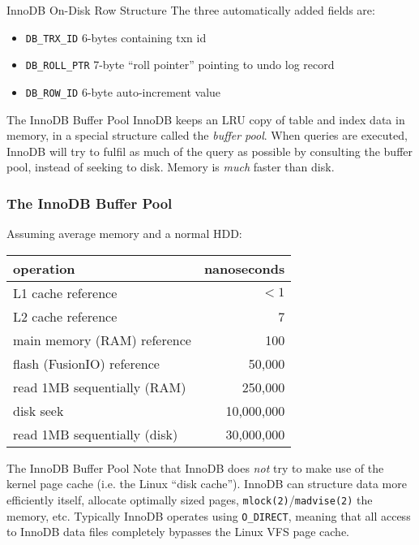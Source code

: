 \documentclass[14pt]{beamer}
\begin{document}
\begin{frame}{InnoDB On-Disk Row Structure}
  The three automatically added fields are:
  \begin{itemize}
    \item \texttt{DB\_TRX\_ID} 6-bytes containing txn id
    \item \texttt{DB\_ROLL\_PTR} 7-byte ``roll pointer'' pointing to undo log record
    \item \texttt{DB\_ROW\_ID} 6-byte auto-increment value
  \end{itemize}
\end{frame}

\begin{frame}{The InnoDB Buffer Pool}
  InnoDB keeps an LRU copy of table and index data in memory, in a special
  structure called the \emph{buffer pool}. When queries are executed, InnoDB
  will try to fulfil as much of the query as possible by consulting the buffer
  pool, instead of seeking to disk.
  \newline
  \newline
  Memory is \emph{much} faster than disk.
\end{frame}

\begin{frame}[fragile]
  \frametitle{The InnoDB Buffer Pool}
  Assuming average memory and a normal HDD:
  \begin{table}[ht]
    \begin{tabular}{l r}
      operation                    & nanoseconds \\ \hline
      L1 cache reference           & $<1$        \\
      L2 cache reference           & 7           \\
      main memory (RAM) reference  & 100         \\
      flash (FusionIO) reference   & 50,000      \\
      read 1MB sequentially (RAM)  & 250,000     \\
      disk seek                    & 10,000,000  \\
      read 1MB sequentially (disk) & 30,000,000  \\
    \end{tabular}
  \end{table}
\end{frame}

\begin{frame}{The InnoDB Buffer Pool}
  Note that InnoDB does \emph{not} try to make use of the kernel page cache
  (i.e. the Linux ``disk cache''). InnoDB can structure data more efficiently
  itself, allocate optimally sized pages, \texttt{mlock(2)}/\texttt{madvise(2)}
  the memory, etc.
  \newline
  \newline
  Typically InnoDB operates using \texttt{O\_DIRECT}, meaning that all access to
  InnoDB data files completely bypasses the Linux VFS page cache.
\end{frame}
\end{document}
